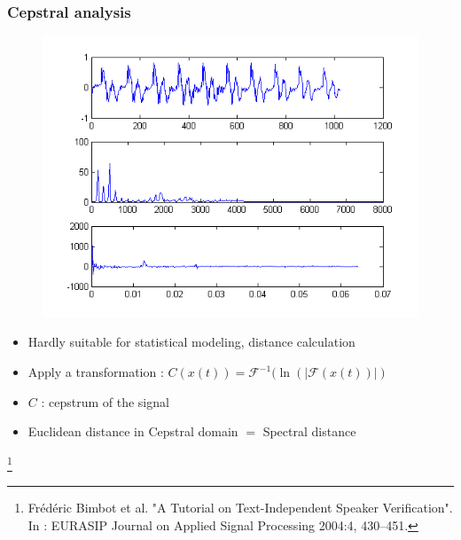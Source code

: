 \documentclass[11pt,english]{beamer}
\newcommand\blfootnote[1]{%
 \begingroup
  \renewcommand\thefootnote{}\footnote{#1}%
  \addtocounter{footnote}{-1}%
  \endgroup
}
\begin{document}
\begin{frame}
  \frametitle{Cepstral analysis}
    \begin{figure}
    \centering
    \includegraphics[trim={0 7.2cm 0 0}, clip, scale = 0.8]{cepstre.png}
    \end{figure}
      
    \begin{itemize}
    \item Hardly suitable for statistical modeling, distance calculation
    \item Apply a transformation :
    $ C(x(t)) = \mathcal{F}^{-1}(\ln(|\mathcal{F}(x(t))|)  $
    \item $C$ : cepstrum of the signal
    \item Euclidean distance in Cepstral domain $=$ Spectral distance 
    \end{itemize}
     \blfootnote{Frédéric Bimbot et al. "A Tutorial on Text-Independent Speaker Verification".  In : EURASIP Journal on Applied Signal Processing 2004:4, 430–451.}
  \end{frame}
\end{document}
